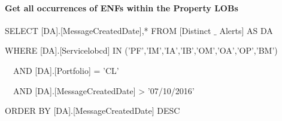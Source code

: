 \documentclass[a4paper,12pt]{report}
\begin{document}
\paragraph*{Get all occurrences of ENFs within the Property LOBs}
 \par
{\fontsize{9pt}{9pt}\selectfont SELECT [DA].[MessageCreatedDate],* FROM [Distinct $  \_  $ Alerts] AS DA } \par
{\fontsize{9pt}{9pt}\selectfont WHERE  [DA].[Servicelobcd] IN ('PF','IM','IA','IB','OM','OA','OP','BM') } \par
{\fontsize{9pt}{9pt}\selectfont  $  $  $  $  $  $ AND [DA].[Portfolio] = 'CL' } \par
{\fontsize{9pt}{9pt}\selectfont  $  $  $  $  $  $ AND [DA].[MessageCreatedDate] > '07/10/2016' } \par
{\fontsize{9pt}{9pt}\selectfont ORDER BY [DA].[MessageCreatedDate] DESC } \par
\vspace{14pt}
\end{document}

